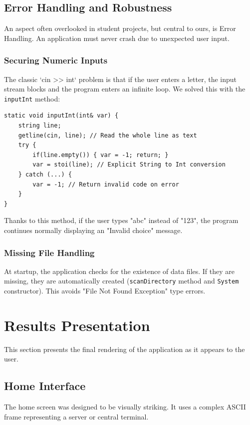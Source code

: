 \documentclass[12pt,a4paper]{report}
\begin{document}
\section{Error Handling and Robustness}
An aspect often overlooked in student projects, but central to ours, is Error Handling. An application must never crash due to unexpected user input.

\subsection{Securing Numeric Inputs}
The classic `cin >> int` problem is that if the user enters a letter, the input stream blocks and the program enters an infinite loop.
We solved this with the \texttt{inputInt} method:

\begin{lstlisting}[caption={Secure Integer Input}]
static void inputInt(int& var) {
    string line;
    getline(cin, line); // Read the whole line as text
    try {
        if(line.empty()) { var = -1; return; }
        var = stoi(line); // Explicit String to Int conversion
    } catch (...) {
        var = -1; // Return invalid code on error
    }
}
\end{lstlisting}
Thanks to this method, if the user types "abc" instead of "123", the program continues normally displaying an "Invalid choice" message.

\subsection{Missing File Handling}
At startup, the application checks for the existence of data files. If they are missing, they are automatically created (\texttt{scanDirectory} method and \texttt{System} constructor). This avoids "File Not Found Exception" type errors.

\chapter{Results Presentation}
This section presents the final rendering of the application as it appears to the user.

\section{Home Interface}
The home screen was designed to be visually striking. It uses a complex ASCII frame representing a server or central terminal.
\end{document}
